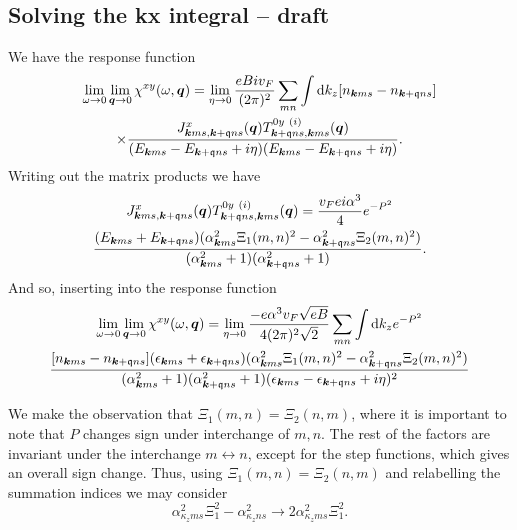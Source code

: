 \subsection{Solving the kx integral -- draft}
We have the response function
\begin{multline*}
  \lim_{\omega \to 0} \lim_{\bm{q} \to 0} \chi^{xy}(\omega, \bm{q}) = \lim_{\eta \to 0}
  \frac{e B i v_F}{(2 \pi)^2}
  \sum\limits_{mn}^{} \int \mathrm{d}k_z [n_{\bm{k} m s} - n_{\bm{k}+\mathfrak{q} n s}]\\
  \times \frac{
    J^x_{\bm{k} m s, \bm{k} + \mathfrak{q} ns} (\bm{q}) T^{0y~(i)}_{\bm{k}+\mathfrak{q} n s, \bm{k}ms}(\bm{q})
  }{
    (E_{\bm{k} m s} - E_{\bm{k}+\mathfrak{q} ns} + i \eta)(E_{\bm{k}ms}-E_{\bm{k}+\mathfrak{q} ns} + i \eta)
  }.
\end{multline*}
Writing out the matrix products we have
\begin{multline}
  J^x_{\bm{k} m s, \bm{k} + \mathfrak{q} ns} (\bm{q}) T^{0y~(i)}_{\bm{k}+\mathfrak{q} n s, \bm{k}ms}(\bm{q})
  =
  \frac{v_F e i \alpha^{3}}{4}
  e^{-P^2}\\
  \frac{
    (E_{\bm{k} m s} + E_{\bm{k}+\mathfrak{q} n s})
    (\alpha_{\bm{k} m s}^2 \Xi_1(m,n)^2 - \alpha_{\bm{k} + \mathfrak{q} n s}^2 \Xi_2(m,n)^2)
  }{
    (\alpha_{\bm{k} m s}^2 + 1)(\alpha_{\bm{k}+\mathfrak{q} n s}^2 + 1)
  }.
  \label{eq:100}
\end{multline}
And so, inserting into the response function
\begin{multline}
  \label{eq:101}
  \lim_{\omega \to 0} \lim_{\bm{q} \to 0} \chi^{xy}(\omega, \bm{q}) = \lim_{\eta \to 0}
  \frac{- e \alpha^3 v_F \sqrt{e B} }{4 (2 \pi)^2 \sqrt{2} }
  \sum\limits_{mn}^{}
  \int \mathrm{d}k_z
  e^{-P^2}\\
  \frac{
    [n_{\bm{k} m s} - n_{\bm{k}+\mathfrak{q} n s}]
    (\epsilon_{\bm{k} m s} + \epsilon_{\bm{k}+\mathfrak{q} n s})
    (\alpha_{\bm{k} m s}^2 \Xi_1(m,n)^2 - \alpha_{\bm{k} + \mathfrak{q} n s}^2 \Xi_2(m,n)^2)
  }{
    (\alpha_{\bm{k} m s}^2 + 1)(\alpha_{\bm{k}+\mathfrak{q} n s}^2 + 1)
    (\epsilon_{\bm{k} m s} - \epsilon_{\bm{k}+\mathfrak{q} ns} + i \eta)^2
  }
\end{multline}

We make the observation that \( \Xi _1(m, n) = \Xi _2(n, m) \), where it is important to note that \( P \) changes sign under interchange of \( m,n \).
The rest of the factors are invariant under the interchange \( m \leftrightarrow n \), except for the step functions, which gives an overall sign change.
Thus, using \( \Xi _1(m, n) = \Xi _2(n, m) \) and relabelling the summation indices we may consider
\[
  \alpha_{\kappa_z m s}^2 \Xi_1^2 - \alpha_{\kappa_z n s}^2 \to 2 \alpha_{\kappa_z m s}^2 \Xi_1^2.
\]

